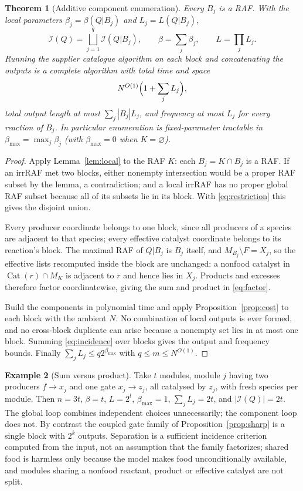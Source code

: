 \documentclass[11pt,a4paper]{article}
\theoremstyle{plain}
\newtheorem{theorem}{Theorem}[section]
\theoremstyle{definition}
\newtheorem{example}[theorem]{Example}
\theoremstyle{remark}
\newcommand{\Irr}{\mathcal I}
\newcommand{\Cat}{\operatorname{Cat}}
\newcommand{\bmax}{\beta_{\max}}
\begin{document}
\begin{theorem}[Additive component enumeration]\label{thm:components}
Every $B_j$ is a RAF. With the local parameters $\beta_j=\beta(Q|B_j)$ and $L_j=L(Q|B_j)$,
\begin{equation}\label{eq:factor}
 \Irr(Q)=\bigsqcup_{j=1}^{q}\Irr(Q|B_j),\qquad \beta=\sum_j\beta_j,\qquad L=\prod_jL_j .
\end{equation}
Running the supplier catalogue algorithm on each block and concatenating the outputs is a complete algorithm with total time and space
\begin{equation}\label{eq:componentcost}
 N^{O(1)}\Bigl(1+\sum_{j}L_j\Bigr),
\end{equation}
total output length at most $\sum_j|B_j|L_j$, and frequency at most $L_j$ for every reaction of $B_j$. In particular enumeration is fixed-parameter tractable in $\bmax=\max_j\beta_j$ (with $\bmax=0$ when $K=\varnothing$).
\end{theorem}
\begin{proof}
Apply Lemma~\ref{lem:local} to the RAF $K$: each $B_j=K\cap B_j$ is a RAF. If an irrRAF met two blocks, either nonempty intersection would be a proper RAF subset by the lemma, a contradiction; and a local irrRAF has no proper global RAF subset because all of its subsets lie in its block. With \eqref{eq:restriction} this gives the disjoint union.

Every producer coordinate belongs to one block, since all producers of a species are adjacent to that species; every effective catalyst coordinate belongs to its reaction's block. The maximal RAF of $Q|B_j$ is $B_j$ itself, and $M_{B_j}\setminus F=X_j$, so the effective lists recomputed inside the block are unchanged: a nonfood catalyst in $\Cat(r)\cap M_K$ is adjacent to $r$ and hence lies in $X_j$. Products and excesses therefore factor coordinatewise, giving the sum and product in \eqref{eq:factor}.

Build the components in polynomial time and apply Proposition~\ref{prop:cost} to each block with the ambient $N$. No combination of local outputs is ever formed, and no cross-block duplicate can arise because a nonempty set lies in at most one block. Summing \eqref{eq:incidence} over blocks gives the output and frequency bounds. Finally $\sum_jL_j\le q2^{\bmax}$ with $q\le m\le N^{O(1)}$.
\end{proof}

\begin{example}[Sum versus product]\label{ex:modules}
Take $t$ modules, module $j$ having two producers $f\to x_j$ and one gate $x_j\to z_j$, all catalysed by $z_j$, with fresh species per module. Then $n=3t$, $\beta=t$, $L=2^t$, $\bmax=1$, $\sum_jL_j=2t$, and $|\Irr(Q)|=2t$. The global loop combines independent choices unnecessarily; the component loop does not. By contrast the coupled gate family of Proposition~\ref{prop:sharp} is a single block with $2^k$ outputs. Separation is a sufficient incidence criterion computed from the input, not an assumption that the family factorizes; shared food is harmless only because the model makes food unconditionally available, and modules sharing a nonfood reactant, product or effective catalyst are not split.
\end{example}
\end{document}
